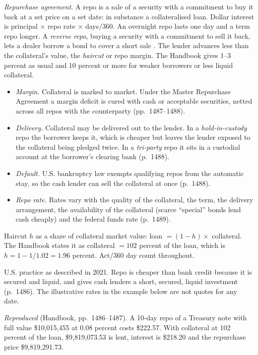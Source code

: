 \begin{qfdefinition}
\emph{Repurchase agreement.} A repo is a sale of a security with a commitment to buy it back at a set price on a set date: in substance a collateralised loan. Dollar interest is principal $\times$ repo rate $\times$ days$/360$. An overnight repo lasts one day and a term repo longer. A \emph{reverse repo}, buying a security with a commitment to sell it back, lets a dealer borrow a bond to cover a short sale \citep[chap.~60, pp.~1485--1486]{s7-fabozzifixed}. The lender advances less than the collateral's value, the \emph{haircut} or repo margin. The Handbook gives 1--3 percent as usual and 10 percent or more for weaker borrowers or less liquid collateral.
\begin{itemize}
\item \emph{Margin.} Collateral is marked to market. Under the Master Repurchase Agreement a margin deficit is cured with cash or acceptable securities, netted across all repos with the counterparty (pp.~1487--1488).
\item \emph{Delivery.} Collateral may be delivered out to the lender. In a \emph{hold-in-custody} repo the borrower keeps it, which is cheaper but leaves the lender exposed to the collateral being pledged twice. In a \emph{tri-party} repo it sits in a custodial account at the borrower's clearing bank (p.~1488).
\item \emph{Default.} U.S. bankruptcy law exempts qualifying repos from the automatic stay, so the cash lender can sell the collateral at once (p.~1488).
\item \emph{Repo rate.} Rates vary with the quality of the collateral, the term, the delivery arrangement, the availability of the collateral (scarce ``special'' bonds lend cash cheaply) and the federal funds rate (p.~1489).
\end{itemize}

 Haircut $h$ as a share of collateral market value: loan $=(1-h)\times$ collateral. The Handbook states it as collateral $=102$ percent of the loan, which is $h=1-1/1.02=1.96$ percent. Act/360 day count throughout.

 U.S. practice as described in 2021. Repo is cheaper than bank credit because it is secured and liquid, and gives cash lenders a short, secured, liquid investment (p.~1486). The illustrative rates in the example below are not quotes for any date.

 \emph{Reproduced} (Handbook, pp.~1486--1487). A 10-day repo of a Treasury note with full value \$10{,}015{,}455 at 0.08 percent costs \$222.57. With collateral at 102 percent of the loan, \$9{,}819{,}073.53 is lent, interest is \$218.20 and the repurchase price \$9{,}819{,}291.73.


\end{qfdefinition}
